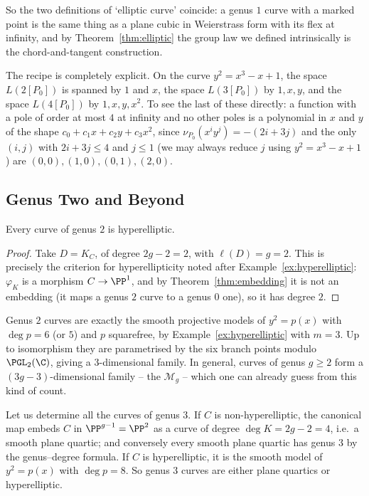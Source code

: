 So the two definitions of `elliptic curve' coincide: a genus $1$ curve with a marked point is the same thing as a plane cubic in Weierstrass form with its flex at infinity, and by Theorem~\ref{thm:elliptic} the group law we defined intrinsically is the chord-and-tangent construction.

\begin{example}
	The recipe is completely explicit. On the curve $y^2 = x^3-x+1$, the space $L(2[P_0])$ is spanned by $1$ and $x$, the space $L(3[P_0])$ by $1,x,y$, and the space $L(4[P_0])$ by $1,x,y,x^2$. To see the last of these directly: a function with a pole of order at most $4$ at infinity and no other poles is a polynomial in $x$ and $y$ of the shape $c_0 + c_1x + c_2y + c_3x^2$, since $\nu_{P_0}(x^iy^j) = -(2i+3j)$ and the only $(i,j)$ with $2i+3j \leq 4$ and $j \leq 1$ (we may always reduce $j$ using $y^2 = x^3-x+1$) are $(0,0),(1,0),(0,1),(2,0)$.
\end{example}

\subsection{Genus Two and Beyond}

\begin{proposition}
	Every curve of genus $2$ is hyperelliptic.
\end{proposition}

\begin{proof}
	Take $D = K_C$, of degree $2g-2 = 2$, with $\ell(D) = g = 2$. This is precisely the criterion for hyperellipticity noted after Example~\ref{ex:hyperelliptic}: $\varphi_{K}$ is a morphism $C \to \PP^1$, and by Theorem~\ref{thm:embedding} it is not an embedding (it maps a genus $2$ curve to a genus $0$ one), so it has degree $2$.
\end{proof}

\begin{example}
	Genus $2$ curves are exactly the smooth projective models of $y^2 = p(x)$ with $\deg p = 6$ (or $5$) and $p$ squarefree, by Example~\ref{ex:hyperelliptic} with $m = 3$. Up to isomorphism they are parametrised by the six branch points modulo $\PGL_2(\C)$, giving a $3$-dimensional family. In general, curves of genus $g \geq 2$ form a $(3g-3)$-dimensional family -- the  $\mathcal M_g$ -- which one can already guess from this kind of count.
\end{example}

\begin{example}
	Let us determine all the curves of genus $3$. If $C$ is non-hyperelliptic, the canonical map embeds $C$ in $\PP^{g-1} = \PP^2$ as a curve of degree $\deg K = 2g-2 = 4$, i.e.\ a smooth plane quartic; and conversely every smooth plane quartic has genus $3$ by the genus--degree formula. If $C$ is hyperelliptic, it is the smooth model of $y^2 = p(x)$ with $\deg p = 8$. So genus $3$ curves are either plane quartics or hyperelliptic.
\end{example}

